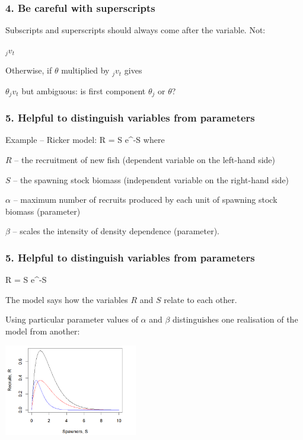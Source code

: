 
\begin{frame}
\frametitle{4. Be careful with superscripts}
Subscripts and superscripts should always come after the variable. Not:
\bi
  \item $_jv_t$
\ei

Otherwise, if $\theta$ multiplied by $_jv_t$ gives
\bi
  \item $\theta_jv_t$
\ei
but ambiguous: is first component $\theta_j$ or $\theta$?


\end{frame}


\begin{frame}
\frametitle{5. Helpful to distinguish variables from parameters}

Example -- Ricker model:
\eb
\nonumber R = \alpha S \mbox{e}^{-\beta S}
\label{ricker}
\ee
where
\bi
  \item $R$ -- the recruitment of new fish (dependent variable on the left-hand
    side)
  \item $S$ -- the spawning stock biomass (independent variable on the right-hand
    side)
  \item $\alpha$ -- maximum number of recruits produced by each unit
  of spawning stock biomass (parameter)
  \item $\beta$ -- scales the intensity of density dependence (parameter).
\ei


\end{frame}


\begin{frame}
\frametitle{5. Helpful to distinguish variables from parameters}

\eb
\nonumber R = \alpha S \mbox{e}^{-\beta S}
\label{ricker}
\ee

The model says how the variables $R$ and $S$ relate to each other.

\medskip

Using particular parameter values of $\alpha$ and $\beta$ distinguishes one
realisation of the model from another:

\centering
\includegraphics[height=4cm]{images/ricker.png}

\end{frame}



